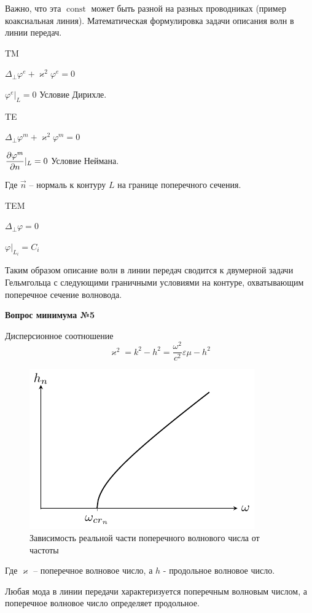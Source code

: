 \documentclass[a4paper,14pt]{extarticle}
\DeclareMathOperator{\const}{const}
\renewcommand{\phi}{\varphi}
\renewcommand{\epsilon}{\varepsilon}
\renewcommand{\kappa}{\varkappa}
\newcommand{\ticket}[1] {
\newpage
\hypertarget{num#1}{}
\begin{center}
	\textbf{Вопрос минимума №#1 }
\end{center}
}
\begin{document}
	Важно, что эта $\const$ может быть разной на разных проводниках (пример коаксиальная линия).
	\newpage
	Математическая формулировка задачи описания волн в линии передач.
	
	TM
	
	$\Delta_\perp\phi^{e}+\kappa^2\phi^{e}=0$
	
	$\phi^e|_L = 0$
	Условие Дирихле.
	\vspace{20pt}
	
	TE
	
	$\Delta_\perp\phi^{m}+\kappa^2\phi^{m}=0$
	
	$\displaystyle \pdv{\phi^m}{n}|_L = 0$
	Условие Неймана.
	
	Где $\vec{n}$ -- нормаль к контуру $L$ на границе поперечного сечения.
	\vspace{20pt}
	
	TEM
	
	$\Delta_\perp\phi=0$
	
	$\phi|_{L_i} = C_i$
	
	Таким образом описание волн в линии передач сводится к двумерной задачи Гельмгольца с следующими граничными условиями на контуре, охватывающим поперечное сечение волновода.
	
\ticket{5}
	Дисперсионное соотношение 
	$$\kappa^2 = k^2 - h^2 = \frac{\omega^2}{c^2}\epsilon\mu - h^2$$
	\begin{figure}[h!]
		\centering
		\includegraphics[scale=1.6]{img/lect2_ris6}
		\caption{Зависимость реальной части поперечного волнового числа от частоты}
		\label{fig:wavegain:5}
	\end{figure}
	Где $\kappa$ -- поперечное волновое число, а $h$ - продольное волновое число. 
	
Любая мода в линии передачи характеризуется поперечным волновым числом, а поперечное волновое число определяет продольное.
\end{document}
